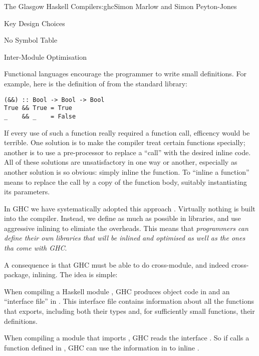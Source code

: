 \begin{aosachapter}{The Glasgow Haskell Compiler}{s:ghc}{Simon Marlow and Simon Peyton-Jones}
\begin{aosasect1}{Key Design Choices}
\begin{aosasect2}{No Symbol Table}
\end{aosasect2}

\begin{aosasect2}{Inter-Module Optimisation}

Functional languages encourage the programmer to write small
definitions.  For example, here is the definition of \code{\&\&} from
the standard library:

\begin{verbatim}
(&&) :: Bool -> Bool -> Bool
True && True = True
_    && _    = False
\end{verbatim}

If every use of such a function really required a function call,
efficency would be terrible.  One solution is to make the compiler
treat certain functions specially; another is to use a pre-processor
to replace a ``call'' with the desired inline code.  All of these
solutions are unsatisfactory in one way or another, especially as
another solution is so obvious: simply inline the function.  To
``inline a function'' means to replace the call by a copy of the
function body, suitably instantiating its parameters.

In GHC we have systematically adopted this approach \cite{bib:inlining}.
Virtually nothing is built into the compiler.  Instead, we define as
much as possible in libraries, and use aggressive inlining to elimiate
the overheads.  This means that \emph{programmers can define their own
  libraries that will be inlined and optimised as well as the ones tha
  come with GHC}.

A consequence is that GHC must be able to do cross-module, and indeed
cross-package, inlining.  The idea is simple:

\begin{aosaitemize}

\item When compiling a Haskell module , GHC produces
  object code in  and an ``interface file'' in
  .  This interface file contains information about all
  the functions that  exports, including both their types
  and, for sufficiently small functions, their definitions.

\item When compiling a module  that imports
  , GHC reads the interface .  So if
   calls a function  defined in ,
  GHC can use the information in  to inline .


\end{aosaitemize}
\end{aosasect2}
\end{aosasect1}
\end{aosachapter}
